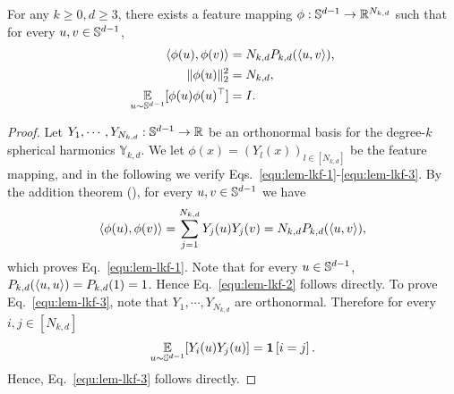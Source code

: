 \begin{lemma}\label{lem:legendre-kernel-feature}
    For any $k\ge 0,d\ge 3$, there exists a feature mapping $\phi:\mathbb{S}^{d-1}\to \mathbb{R}^{N_{k,d}}$ such that for every $u,v\in\mathbb{S}^{d-1}$,
    \begin{align}
        \left<\phi(u), \phi(v)\right> & =N_{k,d}P_{k,d}(\left<u, v\right>),\label{equ:lem-lkf-1}\\
        \|\phi(u)\|_2^2 & = N_{k,d},\label{equ:lem-lkf-2}\\
        \operatorname*{\mathbb{E}}_{u\sim \mathbb{S}^{d-1}}[\phi(u)\phi(u)^\top] & =I.\label{equ:lem-lkf-3}
    \end{align}
\end{lemma}
\begin{proof}
    Let $Y_{1},\cdots,Y_{N_{k,d}}:\mathbb{S}^{d-1}\to \mathbb{R}$ be an orthonormal basis for the degree-$k$ spherical harmonics $\mathbb{Y}_{k,d}.$ We let $\phi(x)=(Y_l(x))_{l\in [N_{k,d}]}$ be the feature mapping, and in the following we verify Eqs.~\eqref{equ:lem-lkf-1}-\eqref{equ:lem-lkf-3}. By the addition theorem (), for every $u,v\in \mathbb{S}^{d-1}$ we have
    \begin{align}
        \left<\phi(u), \phi(v)\right>=\sum_{j=1}^{N_{k,d}}Y_j(u)Y_j(v)=N_{k,d}P_{k,d}(\left<u, v\right>),
    \end{align}
    which proves Eq.~\eqref{equ:lem-lkf-1}. Note that for every $u\in\mathbb{S}^{d-1}$, $P_{k,d}(\left<u, u\right>)=P_{k,d}(1)=1$. Hence Eq.~\eqref{equ:lem-lkf-2} follows directly. To prove Eq.~\eqref{equ:lem-lkf-3}, note that $Y_{1},\cdots,Y_{N_{k,d}}$ are orthonormal. Therefore for every $i,j\in [N_{k,d}]$
    \begin{align}
        \operatorname*{\mathbb{E}}_{u\sim \mathbb{S}^{d-1}}[Y_i(u)Y_j(u)]=\mathbf{1}\left[ i=j \right].
    \end{align}
    Hence, Eq.~\eqref{equ:lem-lkf-3} follows directly.
\end{proof}

